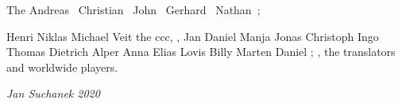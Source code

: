 \raggedright

\noindent The 
Andreas~
Chris\-tian~
John~
Gerhard~
Nathan~;

Henri 
Niklas 
Michael 
Veit 
the ccc,
, 
Jan 
Daniel 
Manja 
Jonas 
Christoph 
Ingo 
Thomas 
Dietrich 
Alper 
Anna 
Elias 
Lovis 
Billy 
Marten 
Daniel ;
,
\noindent the translators
and 
worldwide players.

\medskip
\hfill \emph{Jan Suchanek 2020}